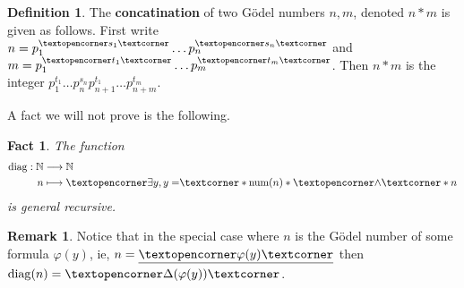 \documentclass[12pt]{article}
\theoremstyle{plain}
\newtheorem{fact}[thm]{Fact}
\theoremstyle{definition}
\newtheorem{defn}[thm]{Definition} %
\newtheorem{remark}[thm]{Remark}
\newcommand{\bb}[1]{\mathbb{#1}}
\newcommand{\adj}[1]{\text{\textopencorner}{#1}\text{\textcorner}}
\newcommand{\lto}{\longrightarrow}
\begin{document}
	\begin{defn}
		The \textbf{concatination} of two G\"{o}del numbers $n,m$, denoted $n \ast m$ is given as follows. First write $n = p_1^{\adj{s_1}}\hdots p_n^{\adj{s_n}}$ and $m = p_1^{\adj{t_1}}\hdots p_m^{\adj{t_m}}$. Then $n \ast m$ is the integer $p_1^{t_1}\hdots p_n^{s_n}p_{n+1}^{t_1}\hdots p_{n+m}^{t_m}$.
	\end{defn}
	A fact we will not prove is the following.
	\begin{fact}
		The function
		\begin{align*}
			\operatorname{diag}: \bb{N} &\lto \bb{N}\\
			n &\longmapsto \adj{\exists y, y =}\ast \operatorname{num}(n)\ast \adj{\wedge} \ast n
		\end{align*}
		is general recursive.
	\end{fact}
	\begin{remark}
		Notice that in the special case where $n$ is the G\"{o}del number of some formula $\varphi(y)$, ie, $n = \underline{\adj{\varphi(y)}}$ then $\operatorname{diag}(n) = \adj{\Delta(\varphi(y))}$.
	\end{remark}
	
\end{document}
